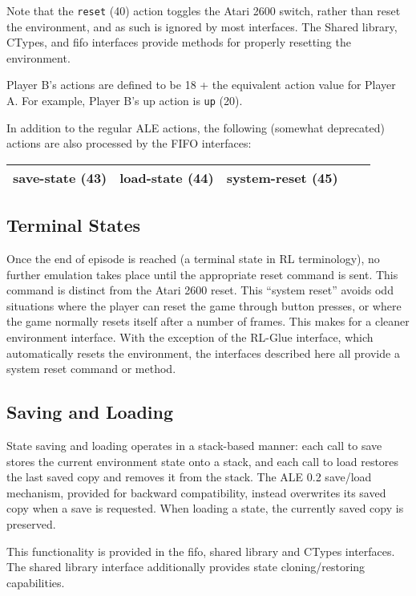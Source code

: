 \documentclass[12pt]{article}
\begin{document}
Note that the \verb+reset+ (40) action toggles the Atari 2600 switch, rather than reset the 
environment, and as such is ignored by most interfaces. The Shared library, CTypes, and fifo
interfaces provide methods for properly resetting the environment. 

Player B's actions are defined to be 18 + the equivalent action value for Player A. For example, Player B's up action is \verb+up+ (20). 

In addition to the regular ALE actions, the following (somewhat deprecated) actions are also processed by the 
FIFO interfaces:

\begin{center}
\begin{tabular}{|r|r|r|r|r|}
\hline
save-state (43) & load-state (44) & system-reset (45) \\
\hline
\end{tabular}
\end{center}

\subsection{Terminal States}

Once the end of episode is reached (a terminal state in RL terminology), no further emulation 
takes place until the appropriate reset command is sent. This command is distinct from the Atari 
2600 reset. This ``system reset'' avoids odd situations where the player can reset the game
through button presses, or where the game normally resets itself after a number of frames. This 
makes for a cleaner environment interface. With the exception of the RL-Glue interface, which 
automatically resets the environment, the interfaces described here all provide a system reset
command or method.

\subsection{Saving and Loading} 

State saving and loading operates in a stack-based manner: each call to save stores the current
environment state onto a stack, and each call to load restores the last saved copy and removes
it from the stack. The ALE 0.2 save/load mechanism, provided for backward compatibility, instead
overwrites its saved copy when a save is requested. When loading a state, the currently saved copy
is preserved. 

This functionality is provided in the fifo, shared library and CTypes interfaces. The shared
library interface additionally provides state cloning/restoring capabilities.
\end{document}
